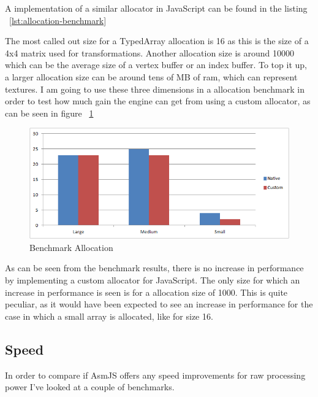 A implementation of a similar allocator in JavaScript can be found in the listing ~\ref{lst:allocation-benchmark}

\lstset{caption=Allocation benchmark (allocator.js), label=lst:allocation-benchmark}


The most called out size for a TypedArray allocation is 16 as this is the size of a 4x4 matrix used for transformations. Another allocation size is around 10000 which can be the average size of a vertex buffer or an index buffer. To top it up, a larger allocation size can be around tens of MB of ram, which can represent textures. I am going to use these three dimensions in a allocation benchmark in order to test how much gain the engine can get from using a custom allocator, as can be seen in figure ~\ref{img:chart1}

\begin{center}
	\begin{figure}[here]
		
		\includegraphics[width=\textwidth]{src/img/chart1.png}
		\caption{Benchmark Allocation}
		\label{img:chart1}
	\end{figure}
\end{center}

As can be seen from the benchmark results, there is no increase in performance by implementing a custom allocator for JavaScript. The only size for which an increase in performance is seen is for a allocation size of 1000. This is quite peculiar, as it would have been expected to see an increase in performance for the case in which a small array is allocated, like for size 16.

\subsection{Speed}

In order to compare if AsmJS offers any speed improvements for raw processing power I've looked at a couple of benchmarks.


